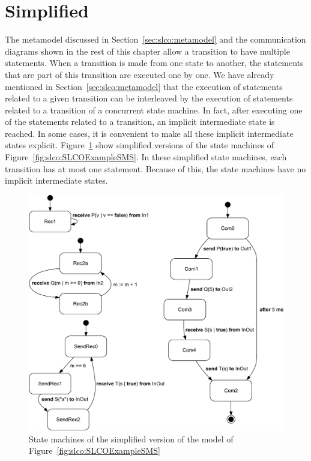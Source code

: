 \section{Simplified \SLCO}
\label{sec:SLCO:simplified_slco}
The \SLCO metamodel discussed in Section~\ref{sec:slco:metamodel} and the communication diagrams shown in the rest of this chapter allow a transition to have multiple statements.
When a transition is made from one state to another, the statements that are part of this transition are executed one by one.
We have already mentioned in Section~\ref{sec:slco:metamodel} that the execution of statements related to a given transition can be interleaved by the execution of statements related to a transition of a concurrent state machine.
In fact, after executing one of the statements related to a transition, an implicit intermediate state is reached.
In some cases, it is convenient to make all these implicit intermediate states explicit.
Figure~\ref{fig:slco:SLCOExampleSMSMinimized} show simplified versions of the state machines of Figure~\ref{fig:slco:SLCOExampleSMS}.
In these simplified state machines, each transition has at most one statement.
Because of this, the state machines have no implicit intermediate states.

\begin{figure}[hbt]
  \centering
  \includegraphics[scale=0.45]{slco/figs/CoreWithTimeMinimized/Behavior_CoreWithTimeMinimized}
  \caption{State machines of the simplified version of the \SLCO model of Figure~\ref{fig:slco:SLCOExampleSMS}}
  \label{fig:slco:SLCOExampleSMSMinimized}
\end{figure}

